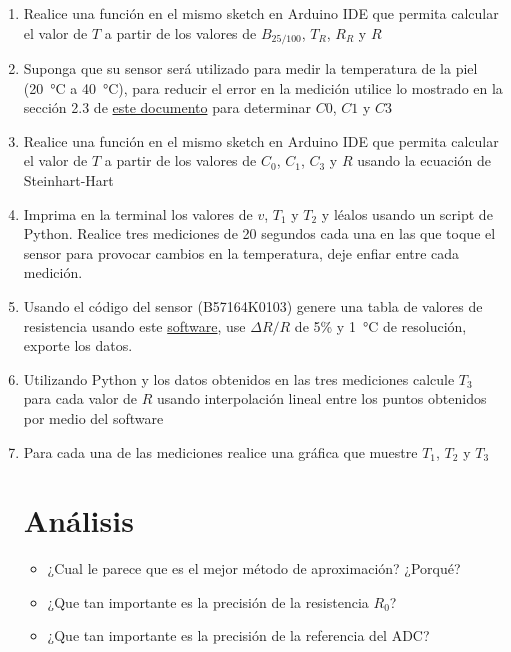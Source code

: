 \begin{enumerate}
\item Realice una función en el mismo sketch en Arduino IDE que permita calcular el valor de $T$ a partir de los valores de $B_{25/100}$, $T_R$, $R_R$ y $R$
\item Suponga que su sensor será utilizado para medir la temperatura de la piel (\SI{20}{\celsius} a \SI{40}{\celsius}), para reducir el error en la medición utilice lo mostrado en la sección 2.3 de \href{https://www.tdk-electronics.tdk.com/download/2999750/740594dd4ec109808826d1b5c774b3f6/ntc-thermistors-readout-trimming-an.pdf}{este documento} para determinar $C0$, $C1$ y $C3$
\item Realice una función en el mismo sketch en Arduino IDE que permita calcular el valor de $T$ a partir de los valores de $C_0$, $C_1$, $C_3$ y $R$ usando la ecuación de Steinhart-Hart
\item Imprima en la terminal los valores de $v$, $T_1$ y $T_2$ y léalos usando un script de Python. Realice tres mediciones de 20 segundos cada una en las que toque el sensor para provocar cambios en la temperatura, deje enfiar entre cada medición. 
\item Usando el código del sensor (B57164K0103) genere una tabla de valores de resistencia usando este \href{https://tools.tdk-electronics.tdk.com/ntc/}{software}, use $\Delta R / R$ de 5\% y \SI{1}{\celsius} de resolución, exporte los datos.
\item Utilizando Python y los datos obtenidos en las tres mediciones calcule $T_3$ para cada valor de $R$ usando interpolación lineal entre los puntos obtenidos por medio del software 
\item Para cada una de las mediciones realice una gráfica que muestre $T_1$, $T_2$ y $T_3$
\section{Análisis}
\begin{itemize}
    \item ¿Cual le parece que es el mejor método de aproximación? ¿Porqué?
    \item ¿Que tan importante es la precisión de la resistencia $R_0$?
    \item ¿Que tan importante es la precisión de la referencia del ADC?
\end{itemize}

\end{enumerate}